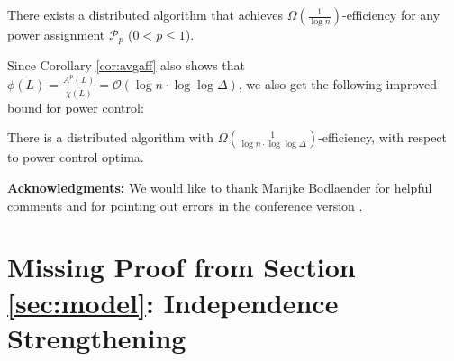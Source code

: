 \documentclass[11pt]{amsart}
\newcommand{\cal}[1]{\mathcal{#1}}
\newcommand{\BO}{\mathcal{O}}
\def\calP{{\cal P}}
\def\calP{{\cal P}}   \def\calM{{\cal M}}   \def\calU{{\cal U}}   \newcommand{\PCopt}{\overline{OPT}}
\newcommand{\powp}{\calP_p}
\begin{document}
\begin{corollary}
There exists a distributed algorithm that achieves $\Omega\left(\frac1{\log n}\right)$-efficiency for any power assignment $\powp$ ($0 < p \le 1$). 
\end{corollary}



Since Corollary \ref{cor:avgaff} also shows that $\overline{\phi(L)} = \frac{A^p(L)}{\overline{\chi(L)}} = \BO(\log n \cdot \log\log\Delta)$, we also get the following improved bound
for power control:
\begin{corollary}
There is a distributed algorithm with $\Omega\left(\frac{1}{\log n \cdot \log\log \Delta}\right)$-efficiency, with respect to power control optima.
\end{corollary}

\textbf{Acknowledgments:} We would like to thank Marijke Bodlaender for helpful comments and for pointing out errors in the conference version \cite{us:SODA13}.
 









		

\appendix

\section{Missing Proof from Section \ref{sec:model}: Independence Strengthening}
\label{app:model}
\end{document}

